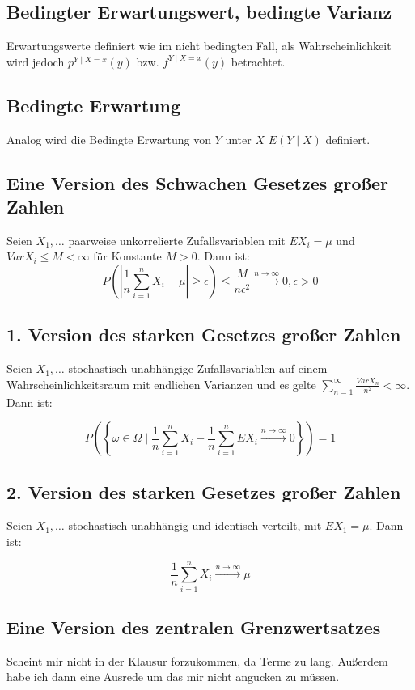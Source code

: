 \documentclass{scrartcl}%
\begin{document}
\subsection{Bedingter Erwartungswert, bedingte Varianz}
Erwartungswerte definiert wie im nicht bedingten Fall, als Wahrscheinlichkeit wird jedoch $p^{Y\mid X=x}(y)$ bzw. $f^{Y\mid X=x} (y)$ betrachtet.

\subsection{Bedingte Erwartung}
Analog wird die Bedingte Erwartung von $Y$ unter $X$ $E(Y\mid X)$ definiert.

\subsection{Eine Version des Schwachen Gesetzes großer Zahlen}
Seien $X_1, \ldots$ paarweise unkorrelierte Zufallsvariablen mit $EX_i = \mu$ und $Var X_i \leq M < \infty$ für Konstante $M > 0$. Dann ist:
\[P\left(\left\vert {\frac{1}{n}\sum\limits_{i=1}^n X_i - \mu}\right\vert \geq \epsilon\right) \leq \frac{M}{n\epsilon^2} \xrightarrow{n \to \infty} 0, \epsilon > 0\]

\subsection{1. Version des starken Gesetzes großer Zahlen}
Seien $X_1,\ldots$ stochastisch unabhängige Zufallsvariablen auf einem Wahrscheinlichkeitsraum mit endlichen Varianzen und es gelte $\sum_{n=1}^\infty \frac{Var X_n}{n^2} < \infty$. Dann ist:

\[P \left(\left \{ \omega \in \Omega \mid \frac{1}{n}\sum\limits_{i=1}^nX_i - \frac{1}{n} \sum\limits_{i=1}^n EX_i \xrightarrow{n \to \infty} 0 \right \} \right) = 1\]

\subsection{2. Version des starken Gesetzes großer Zahlen}
Seien $X_1, \ldots$ stochastisch unabhängig und identisch verteilt, mit $EX_1 = \mu$. Dann ist:

\[\frac{1}{n}\sum\limits_{i=1}^n X_i \xrightarrow{n \to \infty} \mu\]

\subsection{Eine Version des zentralen Grenzwertsatzes}
Scheint mir nicht in der Klausur forzukommen, da Terme zu lang. Außerdem habe ich dann eine Ausrede um das mir nicht angucken zu müssen. 
\end{document}
